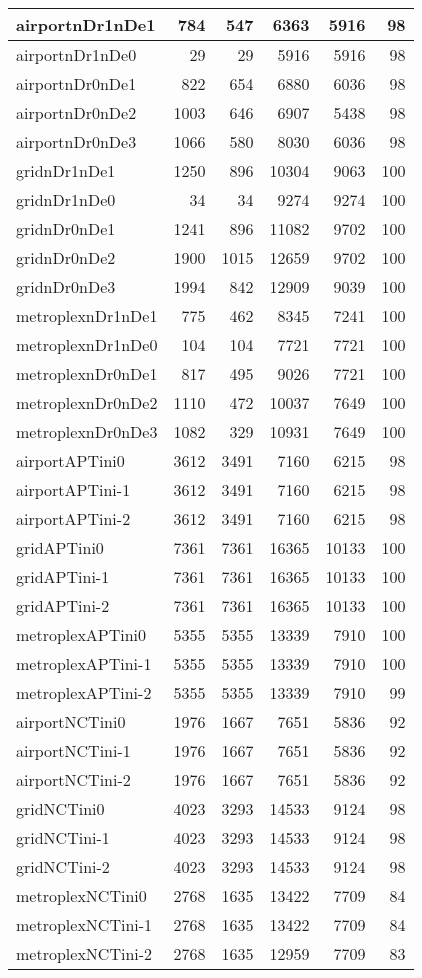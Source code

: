 \begin{longtable}{|l|r|r|r|r|r|}
\endlastfoot
airportnDr1nDe1 & 784 & 547 & 6363 & 5916 & 98 \\ \hline
airportnDr1nDe0 & 29 & 29 & 5916 & 5916 & 98 \\ \hline
airportnDr0nDe1 & 822 & 654 & 6880 & 6036 & 98 \\ \hline
airportnDr0nDe2 & 1003 & 646 & 6907 & 5438 & 98 \\ \hline
airportnDr0nDe3 & 1066 & 580 & 8030 & 6036 & 98 \\ \hline
gridnDr1nDe1 & 1250 & 896 & 10304 & 9063 & 100 \\ \hline
gridnDr1nDe0 & 34 & 34 & 9274 & 9274 & 100 \\ \hline
gridnDr0nDe1 & 1241 & 896 & 11082 & 9702 & 100 \\ \hline
gridnDr0nDe2 & 1900 & 1015 & 12659 & 9702 & 100 \\ \hline
gridnDr0nDe3 & 1994 & 842 & 12909 & 9039 & 100 \\ \hline
metroplexnDr1nDe1 & 775 & 462 & 8345 & 7241 & 100 \\ \hline
metroplexnDr1nDe0 & 104 & 104 & 7721 & 7721 & 100 \\ \hline
metroplexnDr0nDe1 & 817 & 495 & 9026 & 7721 & 100 \\ \hline
metroplexnDr0nDe2 & 1110 & 472 & 10037 & 7649 & 100 \\ \hline
metroplexnDr0nDe3 & 1082 & 329 & 10931 & 7649 & 100 \\ \hline
airportAPTini0 & 3612 & 3491 & 7160 & 6215 & 98 \\ \hline
airportAPTini-1 & 3612 & 3491 & 7160 & 6215 & 98 \\ \hline
airportAPTini-2 & 3612 & 3491 & 7160 & 6215 & 98 \\ \hline
gridAPTini0 & 7361 & 7361 & 16365 & 10133 & 100 \\ \hline
gridAPTini-1 & 7361 & 7361 & 16365 & 10133 & 100 \\ \hline
gridAPTini-2 & 7361 & 7361 & 16365 & 10133 & 100 \\ \hline
metroplexAPTini0 & 5355 & 5355 & 13339 & 7910 & 100 \\ \hline
metroplexAPTini-1 & 5355 & 5355 & 13339 & 7910 & 100 \\ \hline
metroplexAPTini-2 & 5355 & 5355 & 13339 & 7910 & 99 \\ \hline
airportNCTini0 & 1976 & 1667 & 7651 & 5836 & 92 \\ \hline
airportNCTini-1 & 1976 & 1667 & 7651 & 5836 & 92 \\ \hline
airportNCTini-2 & 1976 & 1667 & 7651 & 5836 & 92 \\ \hline
gridNCTini0 & 4023 & 3293 & 14533 & 9124 & 98 \\ \hline
gridNCTini-1 & 4023 & 3293 & 14533 & 9124 & 98 \\ \hline
gridNCTini-2 & 4023 & 3293 & 14533 & 9124 & 98 \\ \hline
metroplexNCTini0 & 2768 & 1635 & 13422 & 7709 & 84 \\ \hline
metroplexNCTini-1 & 2768 & 1635 & 13422 & 7709 & 84 \\ \hline
metroplexNCTini-2 & 2768 & 1635 & 12959 & 7709 & 83 \\ \hline
\end{longtable}
